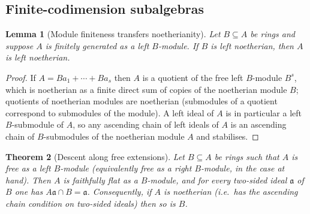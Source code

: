 \documentclass[11pt]{ctexart}
\theoremstyle{plain}
\newtheorem{theorem}{Theorem}[section]
\newtheorem{lemma}[theorem]{Lemma}
\theoremstyle{definition}
\theoremstyle{remark}
\begin{document}
\subsection{Finite-codimension subalgebras}

\begin{lemma}[Module finiteness transfers noetherianity]\label{lem:module}
Let $B\subseteq A$ be rings and suppose $A$ is finitely generated as a left
$B$-module. If $B$ is left noetherian, then $A$ is left noetherian.
\end{lemma}

\begin{proof}
If $A=B a_1+\cdots+B a_s$ then $A$ is a quotient of the free left $B$-module $B^s$,
which is noetherian as a finite direct sum of copies of the noetherian module $B$;
quotients of noetherian modules are noetherian (submodules of a quotient correspond
to submodules of the module). A left ideal of $A$ is in particular a left
$B$-submodule of $A$, so any ascending chain of left ideals of $A$ is an ascending
chain of $B$-submodules of the noetherian module $A$ and stabilises.
\end{proof}

\begin{theorem}[Descent along free extensions]\label{thm:descent}
Let $B\subseteq A$ be rings such that $A$ is free as a left $B$-module (equivalently
free as a right $B$-module, in the case at hand). Then $A$ is faithfully flat as a
$B$-module, and for every two-sided ideal $\mathfrak{a}$ of $B$ one has
$A\mathfrak{a}\cap B=\mathfrak{a}$. Consequently, if $A$ is noetherian (i.e.\ has the
ascending chain condition on two-sided ideals) then so is $B$.
\end{theorem}
\end{document}
